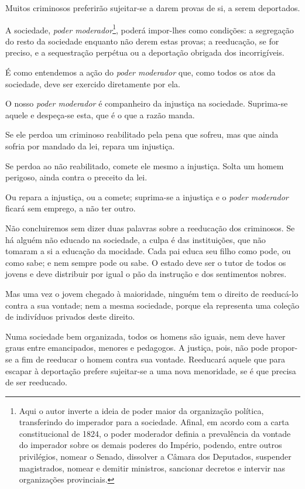 Muitos criminosos preferirão sujeitar-se a darem provas de si, a serem
deportados.

A sociedade, \emph{poder moderador}\footnote{Aqui o autor inverte a
  ideia de poder maior da organização política, transferindo do
  imperador para a sociedade. Afinal, em acordo com a carta
  constitucional de 1824, o poder moderador definia a prevalência da
  vontade do imperador sobre os demais poderes do Império, podendo,
  entre outros privilégios, nomear o Senado, dissolver a Câmara dos
  Deputados, suspender magistrados, nomear e demitir ministros,
  sancionar decretos e intervir nas organizações provinciais.}, poderá
impor-lhes como condições: a segregação do resto da sociedade enquanto
não derem estas provas; a reeducação, se for preciso, e a sequestração
perpétua ou a deportação obrigada dos incorrigíveis.

É como entendemos a ação do \emph{poder moderador} que, como todos os
atos da sociedade, deve ser exercido diretamente por ela.

O nosso \emph{poder moderador} é companheiro da injustiça na sociedade.
Suprima-se aquele e despeça-se esta, que é o que a razão manda.

Se ele perdoa um criminoso reabilitado pela pena que sofreu, mas que
ainda sofria por mandado da lei, repara um injustiça.

Se perdoa ao não reabilitado, comete ele mesmo a injustiça. Solta um
homem perigoso, ainda contra o preceito da lei.

Ou repara a injustiça, ou a comete; suprima-se a injustiça e o
\emph{poder moderador} ficará sem emprego, a não ter outro.

Não concluiremos sem dizer duas palavras sobre a reeducação dos
criminosos. Se há alguém não educado na sociedade, a culpa é das
instituições, que não tomaram a si a educação da mocidade. Cada pai
educa seu filho como pode, ou como sabe; e nem sempre pode ou sabe. O
estado deve ser o tutor de todos os jovens e deve distribuir por igual o
pão da instrução e dos sentimentos nobres.

Mas uma vez o jovem chegado à maioridade, ninguém tem o direito de
reeducá-lo contra a sua vontade; nem a mesma sociedade, porque ela
representa uma coleção de indivíduos privados deste direito.

Numa sociedade bem organizada, todos os homens são iguais, nem deve
haver graus entre emancipados, menores e pedagogos. A justiça, pois, não
pode propor-se a fim de reeducar o homem contra sua vontade. Reeducará
aquele que para escapar à deportação prefere sujeitar-se a uma nova
menoridade, se é que precisa de ser reeducado.

